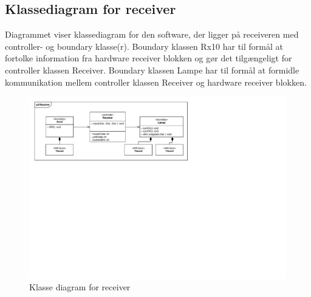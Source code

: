 \subsection{Klassediagram for receiver}
Diagrammet viser klassediagram for den software, der ligger på receiveren med controller- og boundary klasse(r). Boundary klassen Rx10 har til formål at fortolke information fra hardware receiver blokken og gør det tilgængeligt for controller klassen Receiver. Boundary klassen Lampe har til formål at formidle kommunikation mellem controller klassen Receiver og hardware receiver blokken.
\begin{figure}[h]
	\centering 
	\includegraphics[width=\textwidth, trim=17 385 324 17, clip=true]{Systemarkitektur/Diagrammer/Receiver_Klassediagram.pdf}
	\caption{Klasse diagram for receiver}
	\label{fig:Rec_klasse}
\end{figure}

\clearpage